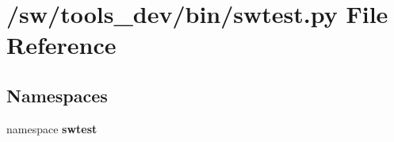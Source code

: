 \section{/sw/tools\_\-dev/bin/swtest.py File Reference}
\label{swtest_8py}
\subsection*{Namespaces}
\begin{CompactItemize}
\item 
namespace {\bf swtest}
\end{CompactItemize}
